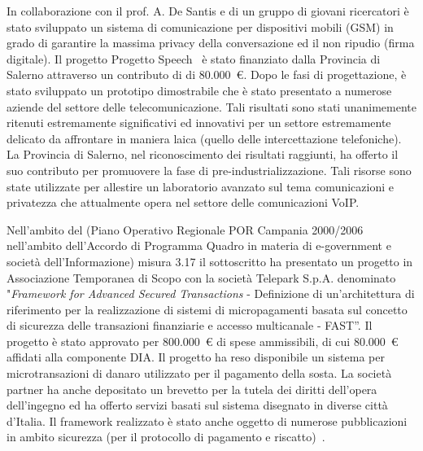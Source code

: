 \documentclass[11pt,a4paper,sans]{moderncv}        %
\begin{document}
{
In collaborazione con il prof. A. De Santis e di un gruppo di giovani ricercatori è stato sviluppato un sistema di comunicazione per dispositivi mobili (GSM) in grado di garantire la massima privacy della conversazione ed il non ripudio (firma digitale). Il progetto Progetto Speech~\cite{Castiglione2006287} è stato finanziato dalla Provincia di Salerno attraverso un contributo di di 80.000~\euro{}. Dopo le fasi di progettazione, è stato sviluppato un prototipo dimostrabile che è stato presentato a numerose aziende del settore delle telecomunicazione. Tali risultati sono stati unanimemente ritenuti estremamente significativi ed innovativi per un settore estremamente delicato da affrontare in  maniera laica (quello delle intercettazione telefoniche). La Provincia di Salerno, nel riconoscimento dei risultati raggiunti, ha offerto il suo contributo per promuovere la fase di pre-industrializzazione. Tali risorse sono state utilizzate per allestire un laboratorio avanzato sul tema comunicazioni e privatezza che attualmente opera nel settore delle comunicazioni VoIP.
}

{
Nell'ambito del (Piano Operativo Regionale POR Campania 2000/2006 nell’ambito dell’Accordo di Programma Quadro in materia di e-government e società dell’Informazione) misura 3.17 il sottoscritto ha presentato un progetto in Associazione Temporanea di Scopo con la società Telepark S.p.A. denominato "{\em Framework for Advanced Secured Transactions} - Definizione di un’architettura di riferimento per la realizzazione di sistemi di micropagamenti  basata sul concetto di sicurezza delle transazioni finanziarie e accesso multicanale - FAST''.
Il progetto è stato approvato per 800.000~\euro{} di spese ammissibili, di cui 80.000~\euro{} affidati alla componente DIA.
Il progetto ha reso disponibile un sistema per microtransazioni di danaro utilizzato per il pagamento della sosta. La società partner ha anche depositato un brevetto per la tutela dei diritti dell'opera dell'ingegno ed ha offerto servizi basati sul sistema disegnato in diverse città d'Italia.
Il framework realizzato è stato anche oggetto di numerose pubblicazioni in ambito sicurezza (per il protocollo di pagamento e riscatto)~\cite{Castiglione200962,DeSantis2010843}.
}
\end{document}
